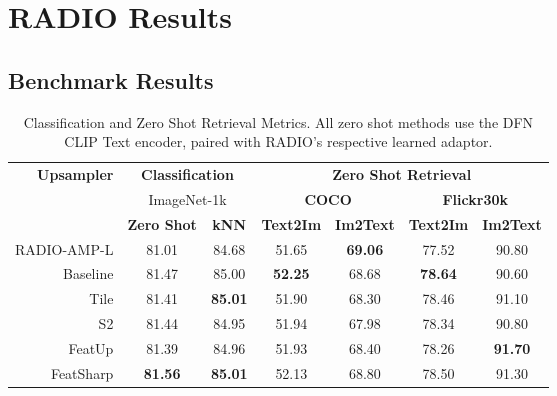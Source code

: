 \appendix
\onecolumn

\section{RADIO Results}

\subsection{Benchmark Results}\label{sec:apdx:raw_radio_results}
\begin{table}[h]
    \centering
    \begin{tabular}{r|cc|cccc}
        \multirow{3}{*}{\bf{Upsampler}} & \multicolumn{2}{c|}{\bf{Classification}}  & \multicolumn{4}{c}{\bf{Zero Shot Retrieval}} \\
                           & \multicolumn{2}{c|}{ImageNet-1k} & \multicolumn{2}{c|}{\bf{COCO}} & \multicolumn{2}{c}{\bf{Flickr30k}} \\
                           & \bf{Zero Shot} & \bf{kNN}   & \bf{Text2Im} & \bf{Im2Text} & \bf{Text2Im} & \bf{Im2Text} \\
        \hline
        RADIO-AMP-L        & 81.01          & 84.68      & 51.65        & \bf{69.06}   & 77.52        & 90.80        \\
        \hline
        Baseline           & 81.47          & 85.00      & \bf{52.25}   & 68.68        & \bf{78.64}   & 90.60        \\
        Tile               & 81.41          & \bf{85.01} & 51.90        & 68.30        & 78.46        & 91.10        \\
        S2                 & 81.44          & 84.95      & 51.94        & 67.98        & 78.34        & 90.80        \\
        FeatUp             & 81.39          & 84.96      & 51.93        & 68.40        & 78.26        & \bf{91.70}   \\
        FeatSharp          & \bf{81.56}     & \bf{85.01} & 52.13        & 68.80        & 78.50        & 91.30        \\
    \end{tabular}
    \caption{Classification and Zero Shot Retrieval Metrics. All zero shot methods use the DFN CLIP Text encoder, paired with RADIO's respective learned adaptor.}
    \label{tab:apdx:radio_cls_retrieval_metrics}
\end{table}

